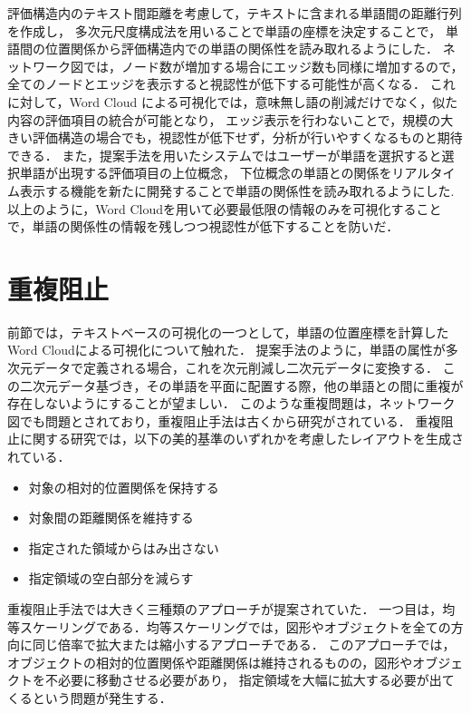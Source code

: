 \documentclass[syuuron]{kuee}
\begin{document}
		評価構造内のテキスト間距離を考慮して，テキストに含まれる単語間の距離行列を作成し，
		多次元尺度構成法を用いることで単語の座標を決定することで，
		単語間の位置関係から評価構造内での単語の関係性を読み取れるようにした．
		ネットワーク図では，ノード数が増加する場合にエッジ数も同様に増加するので，全てのノードとエッジを表示すると視認性が低下する可能性が高くなる．
		これに対して，Word Cloud による可視化では，意味無し語の削減だけでなく，似た内容の評価項目の統合が可能となり，
		エッジ表示を行わないことで，規模の大きい評価構造の場合でも，視認性が低下せず，分析が行いやすくなるものと期待できる．
		また，提案手法を用いたシステムではユーザーが単語を選択すると選択単語が出現する評価項目の上位概念，
		下位概念の単語との関係をリアルタイム表示する機能を新たに開発することで単語の関係性を読み取れるようにした.
		以上のように，Word Cloudを用いて必要最低限の情報のみを可視化することで，単語の関係性の情報を残しつつ視認性が低下することを防いだ．
		
	\section{重複阻止}
		前節では，テキストベースの可視化の一つとして，単語の位置座標を計算したWord Cloudによる可視化について触れた．
		提案手法のように，単語の属性が多次元データで定義される場合，これを次元削減し二次元データに変換する．
		この二次元データ基づき，その単語を平面に配置する際，他の単語との間に重複が存在しないようにすることが望ましい．
		このような重複問題は，ネットワーク図でも問題とされており，重複阻止手法は古くから研究がされている．
		重複阻止に関する研究では，以下の美的基準のいずれかを考慮したレイアウトを生成されている\cite{fta2}\cite{or2}．
		\begin{itemize}
			\item 対象の相対的位置関係を保持する
			\item 対象間の距離関係を維持する
			\item 指定された領域からはみ出さない
			\item 指定領域の空白部分を減らす
		\end{itemize}
		
		重複阻止手法では大きく三種類のアプローチが提案されていた．
		一つ目は，均等スケーリングである．均等スケーリングでは，図形やオブジェクトを全ての方向に同じ倍率で拡大または縮小するアプローチである\cite{fsa1}．
		このアプローチでは，オブジェクトの相対的位置関係や距離関係は維持されるものの，図形やオブジェクトを不必要に移動させる必要があり，
		指定領域を大幅に拡大する必要が出てくるという問題が発生する．
		
\end{document}
